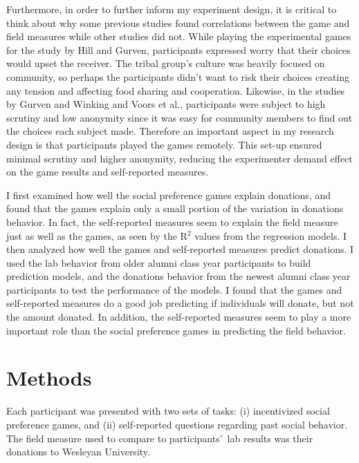 \documentclass[12pt]{article}
\begin{document}
Furthermore, in order to further inform my experiment design, it is critical to think about why some previous studies found correlations between the game and field measures while other studies did not. While playing the experimental games for the study by Hill and Gurven, participants expressed worry that their choices would upset the receiver. The tribal group\rq s culture was heavily focused on community, so perhaps the participants didn\rq t want to risk their choices creating any tension and affecting food sharing and cooperation. Likewise, in the studies by Gurven and Winking and Voors et al., participants were subject to high scrutiny and low anonymity since it was easy for community members to find out the choices each subject made. Therefore an important aspect in my research design is that participants played the games remotely. This set-up ensured minimal scrutiny and higher anonymity, reducing the experimenter demand effect on the game results and self-reported measures.

I first examined how well the social preference games explain donations, and found that the games explain only a small portion of the variation in donations behavior. In fact, the self-reported measures seem to explain the field measure just as well as the games, as seen by the R$^{2}$ values from the regression models. I then analyzed how well the games and self-reported measures predict donations. I used the lab behavior from older alumni class year participants to build prediction models, and the donations behavior from the newest alumni class year participants to test the performance of the models. I found that the games and self-reported measures do a good job predicting if individuals will donate, but not the amount donated. In addition, the self-reported measures seem to play a more important role than the social preference games in predicting the field behavior.


\section{Methods}

Each participant was presented with two sets of tasks: (i) incentivized social preference games, and (ii) self-reported questions regarding past social behavior. The field measure used to compare to participants\rq \ lab results was their donations to Wesleyan University.  
 
\end{document}
